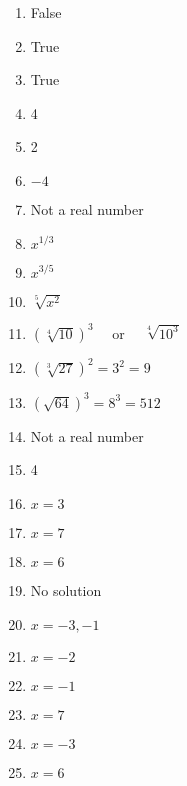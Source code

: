 \documentclass[a4paper]{JAC2003}
\begin{document}
\begin{enumerate}
\item False %

\item True%

\item True

\item 4 %

\item 2

\item $-4$

\item Not a real number%

\item $x^{1 / 3}$

\item $x^{3 / 5}$

\item $\sqrt[5]{x^{2}}$

\item $(\sqrt[4]{10})^{3} \quad$ or $\quad \sqrt[4]{10^{3}}$

\item $(\sqrt[3]{27})^{2}=3^{2}=9$

\item $(\sqrt{64})^{3}=8^{3}=512$

\item Not a real number

\item 4

\item $x=3$

\item $x=7$

\item $x=6$

\item No solution

\item $x=-3,-1$

\item $x=-2$

\item $x=-1$

\item $x=7$

\item $x=-3$

\item $x=6$
\end{enumerate}
\end{document}
